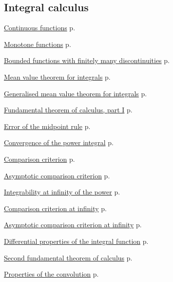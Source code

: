 \documentclass[11pt,a4paper]{article}
\theoremstyle{definition} \newtheorem{definition}{Definition} \theoremstyle{plain} \newtheorem{theorem}{Theorem}
\begin{document}
\subsection*{Integral calculus}
\begin{description}
\item \hyperref[thm:continuous-integrable]{Continuous functions} \dotfill p.~\pageref{thm:continuous-integrable}
\item \hyperref[thm:monotone-integrable]{Monotone functions} \dotfill p.~\pageref{thm:monotone-integrable}
\item \hyperref[thm:finite-discontinuities]{Bounded functions with finitely many discontinuities} \dotfill p.~\pageref{thm:finite-discontinuities}
\item \hyperref[thm:mean-integral]{Mean value theorem for integrals} \dotfill p.~\pageref{thm:mean-integral}
\item \hyperref[thm:generalized-mean-integral]{Generalised mean value theorem for integrals} \dotfill p.~\pageref{thm:generalized-mean-integral}
\item \hyperref[thm:ftc-one]{Fundamental theorem of calculus, part I} \dotfill p.~\pageref{thm:ftc-one}
\item \hyperref[thm:midpoint-error]{Error of the midpoint rule} \dotfill p.~\pageref{thm:midpoint-error}
\item \hyperref[thm:power-integral]{Convergence of the power integral} \dotfill p.~\pageref{thm:power-integral}
\item \hyperref[thm:comparison-integral]{Comparison criterion} \dotfill p.~\pageref{thm:comparison-integral}
\item \hyperref[thm:asymptotic-comparison-integral]{Asymptotic comparison criterion} \dotfill p.~\pageref{thm:asymptotic-comparison-integral}
\item \hyperref[thm:power-infinity]{Integrability at infinity of the power} \dotfill p.~\pageref{thm:power-infinity}
\item \hyperref[thm:comparison-infinity]{Comparison criterion at infinity} \dotfill p.~\pageref{thm:comparison-infinity}
\item \hyperref[thm:asymptotic-comparison-infinity]{Asymptotic comparison criterion at infinity} \dotfill p.~\pageref{thm:asymptotic-comparison-infinity}
\item \hyperref[thm:differential-integral]{Differential properties of the integral function} \dotfill p.~\pageref{thm:differential-integral}
\item \hyperref[thm:ftc-two]{Second fundamental theorem of calculus} \dotfill p.~\pageref{thm:ftc-two}
\item \hyperref[thm:convolution]{Properties of the convolution} \dotfill p.~\pageref{thm:convolution}
\end{description}
\end{document}
